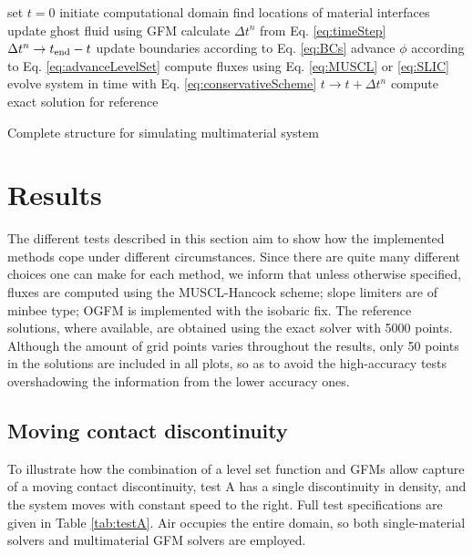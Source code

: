 \documentclass[final,3p,twocolumn]{elsarticle}
\begin{document}
\begin{algorithm}[htb]
    set $t=0$\; 
    initiate computational domain\;
    {
        find locations of material interfaces\;
        {
            update ghost fluid using GFM\;
        }
        calculate $\Delta t^n$ from Eq. \eqref{eq:timeStep}\;
        {
            $\Delta t^n \rightarrow t_{\rm end} - t$ \;
        }
        update boundaries according to Eq. \eqref{eq:BCs}\;
        advance $\phi$ according to Eq. \eqref{eq:advanceLevelSet}\;
        {
            compute fluxes using Eq. \eqref{eq:MUSCL} or \eqref{eq:SLIC}\;
            evolve system in time with Eq.
            \eqref{eq:conservativeScheme}\;
        }
        $t \rightarrow t + \Delta t^n$\;
    }
    {
        compute exact solution for reference\;
    }
    \caption{Complete structure for simulating multimaterial system}
    \label{alg:complete}
\end{algorithm}

\section{Results}
\label{sec:results}

The different tests described in this section aim to show how the implemented
methods cope under different circumstances. Since there are quite many
different choices one can make for each method, we inform that unless otherwise
specified, fluxes are computed using the MUSCL-Hancock scheme; slope limiters
are of minbee type; OGFM is implemented with the isobaric fix. The reference
solutions, where available, are obtained using the exact solver with 5000
points. Although the amount of grid points varies throughout the results, only
50 points in the solutions are included in all plots, so as to avoid the
high-accuracy tests overshadowing the information from the lower accuracy ones.

\subsection{Moving contact discontinuity}
\label{subsec:moving}

To illustrate how the combination of a level set function and GFMs allow
capture of a moving contact discontinuity, test A has a single discontinuity in
density, and the system moves with constant speed to the right. Full test
specifications are given in Table \ref{tab:testA}. Air occupies the entire
domain, so both single-material solvers and multimaterial GFM solvers are
employed. 
\end{document}
